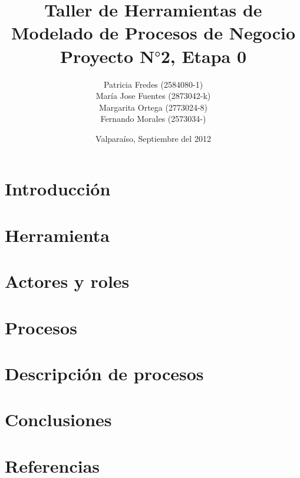 \documentclass[10pt,letterpaper]{article}
\title{Taller de Herramientas de Modelado de Procesos de Negocio \\ Proyecto N$°$2, Etapa 0}
\author{Patricia Fredes (2584080-1) \\ María Jose Fuentes (2873042-k) \\ Margarita Ortega (2773024-8) \\ Fernando Morales (2573034-)}
\date{\vspace*{1cm} Valparaí­so, Septiembre del 2012}
\begin{document}
\maketitle
\thispagestyle{empty}
\newpage
\tableofcontents

\makeatother

\newpage

\section{Introducción}


\section{Herramienta}


\section{Actores y roles}


\section{Procesos}


\section{Descripción de procesos}


\section{Conclusiones}





\section{Referencias}
 
\end{document}
